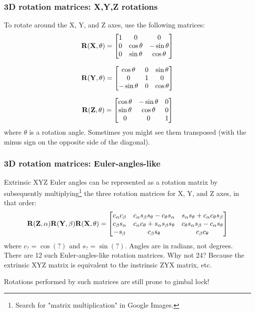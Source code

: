 \documentclass{beamer}
\begin{document}
\begin{frame}
\frametitle{3D rotation matrices: X,Y,Z rotations}

To rotate around the X, Y, and Z axes, use the following matrices:
\[
\rotmat{\grotaxis{x}}{\theta} = 
\begin{bmatrix}	
	1 & 0 & 0 \\
	0 & \cos\theta & -\sin\theta\\
	0 & \sin\theta & \cos\theta
\end{bmatrix}
\]

\[
\rotmat{\grotaxis{y}}{\theta}  = 
\begin{bmatrix}	
	\cos\theta &  0&\sin\theta\\
	0 & 1 & 0 \\
	-\sin\theta & 0 & \cos\theta
\end{bmatrix}
\]

\[
\rotmat{\grotaxis{z}}{\theta} = 
\begin{bmatrix}	
	 \cos\theta & - \sin\theta & 0\\
	 \sin\theta & \cos\theta & 0 \\
	 0&0&1
\end{bmatrix}
\]
where $\theta$ is a rotation angle. 
Sometimes you might see them transposed (with the minus sign on the opposite side of the diagonal).

\end{frame}
	



\begin{frame}
\frametitle{3D rotation matrices: Euler-angles-like}

Extrinsic XYZ Euler angles can be represented as a rotation matrix by subsequently multiplying\footnote{
	Search for "matrix multiplication" in Google Images.
} the three rotation matrices for X, Y, and Z axes, in that order:
\begin{equation*} 
	\rotmat{\grotaxis{Z}}{\alpha} \rotmat{\grotaxis{Y}}{\beta} \rotmat{\grotaxis{X}}{\theta} =
		\begin{bmatrix} 
		c_{\alpha}c_{\beta}&{{c_{\alpha}s_{\beta}s_{\theta}-c_{\theta}s_{\alpha}}}&{{s_{\alpha}s_{\theta}+c_{\alpha}c_{\theta}s_{\beta}}}\\
		c_{\beta}s_{\alpha}&{{c_{\alpha}c_{\theta}+s_{\alpha}s_{\beta}s_{\theta}}}&{{c_{\theta}s_{\alpha}s_{\beta}-c_{\alpha}s_{\theta}}}\\
		-s_{\beta}&c_{\beta}s_{\theta} & c_{\beta}c_{\theta}
	\end{bmatrix}
\end{equation*} 
where $c_?=\cos(?)$ and $s_?=\sin(?)$. Angles are in radians, not degrees.
\vfill
There are 12 such Euler-angles-like rotation matrices. Why not 24? Because the extrinsic XYZ matrix is equivalent to the instrinsic ZYX matrix, etc.
\vfill

Rotations performed by such matrices are still prone to gimbal lock!
\end{frame}
\end{document}
